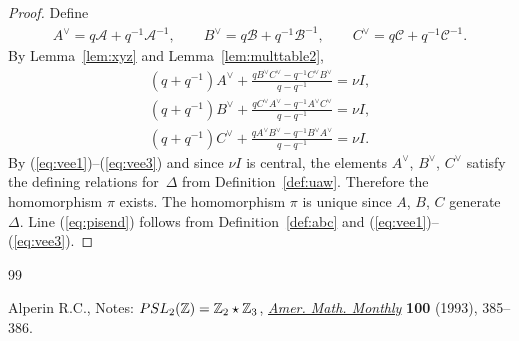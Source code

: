 \documentclass[10pt,a4paper]{amsart}
\begin{document}
\begin{proof}
Def\/ine
\begin{gather*}
A^\vee = q\mathcal A+q^{-1}{\mathcal A}^{-1},
\qquad
B^\vee =q\mathcal B+q^{-1}{\mathcal B}^{-1},
\qquad
C^\vee = q\mathcal C+q^{-1}{\mathcal C}^{-1}.
\end{gather*}
By Lemma~\ref{lem:xyz}
and Lemma~\ref{lem:multtable2},
\begin{gather}
(q+q^{-1})A^\vee+ \frac{qB^\vee C^\vee-q^{-1}C^\vee B^\vee}{q-q^{-1}}
  = \nu I,
\label{eq:vee1}
\\
(q+q^{-1})B^\vee+
\frac{qC^\vee A^\vee -q^{-1}A^\vee C^\vee }{q-q^{-1}}
 =  \nu I,
\label{eq:vee2}
\\
(q+q^{-1})C^\vee +
\frac{qA^\vee B^\vee -q^{-1}B^\vee A^\vee }{q-q^{-1}}
 =  \nu I.
\label{eq:vee3}
\end{gather}
By
(\ref{eq:vee1})--(\ref{eq:vee3}) and
since
 $\nu I$ is central, the elements
$A^\vee$, $B^\vee$, $C^\vee$ satisfy the
def\/ining relations for~$\Delta $ from
Def\/inition~\ref{def:uaw}.
Therefore
the homomorphism $\pi$ exists. The homomorphism $\pi$
is unique since $A$, $B$, $C$ generate~$\Delta $. Line
(\ref{eq:pisend})
follows from
Def\/inition~\ref{def:abc} and
(\ref{eq:vee1})--(\ref{eq:vee3}).
\end{proof}

\begin{thebibliography}{99}

\footnotesize\itemsep=0pt
Alperin R.C.,
Notes: ${\rm  {PSL}}_2(\mathbb Z)= \mathbb Z_2 \star \mathbb Z_3$,
\href{http://dx.doi.org/10.2307/2324963}{{\it Amer. Math. Monthly}} {\bf 100} (1993), 385--386.
\end{thebibliography}
\end{document}
